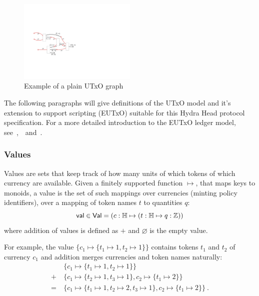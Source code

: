 \begin{figure}[h]
	\centering
	\includegraphics[width=0.5\textwidth]{figures/utxo-graph.pdf}
	\caption{Example of a plain UTxO graph}\label{fig:utxo-graph}
\end{figure}

The following paragraphs will give definitions of the UTxO model and it's
extension to support scripting (EUTxO) suitable for this Hydra Head protocol
specification. For a more detailed introduction to the EUTxO ledger model,
see~\cite{eutxo},~\cite{eutxo-2}~and~\cite{utxo-ma}.

\subsubsection{Values}

\begin{definition}[Values]
	Values are sets that keep track of how many units of which tokens of which
	currency are available. Given a finitely supported function $\mapsto$, that
	maps keys to monoids, a value is the set of such mappings over currencies
	(minting policy identifiers), over a mapping of token names $t$ to
	quantities $q$:
	\[
		\mathsf{val} \in \mathsf{Val} = (c : \mathbb{H} \mapsto (t : \mathbb{H} \mapsto q : \mathbb{Z}))
	\]
	\noindent where addition of values is defined as $+$ and $\varnothing$ is the empty value.
\end{definition}

For example, the value $\{c_{1} \mapsto \{t_1 \mapsto 1, t_2 \mapsto 1\}\}$
contains tokens $t_1$ and $t_2$ of currency $c_{1}$ and addition merges
currencies and token names naturally:
\begin{align*}
	     & \{c_{1} \mapsto \{t_1 \mapsto 1, t_2 \mapsto 1\}\}                                                        \\
	+ \  & \{c_{1} \mapsto \{t_{2} \mapsto 1, t_3 \mapsto 1\}, c_{2} \mapsto \{ t_{1} \mapsto 2\}\}                  \\
	= \  & \{c_{1} \mapsto \{t_1 \mapsto 1, t_2 \mapsto 2, t_3 \mapsto 1\}, c_{2} \mapsto \{ t_{1} \mapsto 2\}\} \ .
\end{align*}

